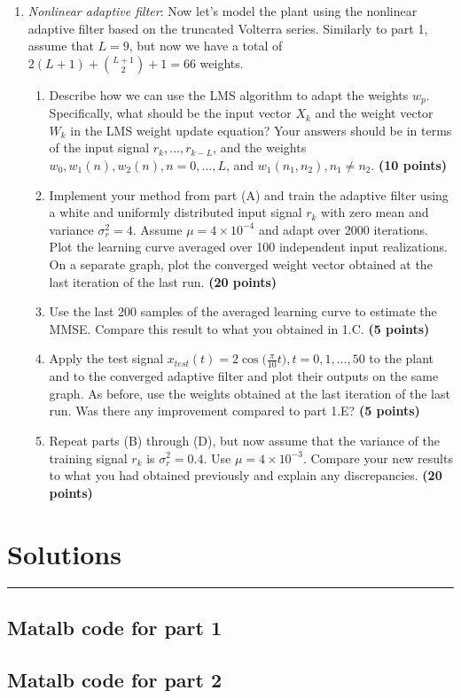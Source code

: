 \documentclass[10pt]{article}
\begin{document}
\begin{enumerate}
	\item\textit{Nonlinear adaptive filter}: Now let's model the plant using the nonlinear adaptive filter based on the truncated Volterra series. Similarly to part 1, assume that $L = 9$, but now we have a total of $2(L+1) + \binom{L+1}{2} + 1 = 66$ weights.
	
	\begin{enumerate}[label=\textbf{(\Alph*)}]
		\item Describe how we can use the LMS algorithm to adapt the weights $w_p$. Specifically, what should be the input vector $X_k$ and the weight vector $W_k$ in the LMS weight update equation? Your answers should be in terms of the input signal $r_k, \ldots, r_{k-L}$, and the weights $w_0, w_1(n), w_2(n), n = 0, \ldots, L$, and $w_1(n_1, n_2), n_1\neq n_2$. \textbf{(10 points)} 
		\item Implement your method from part (A) and train the adaptive filter using a white and uniformly distributed input signal $r_k$ with zero mean and variance $\sigma_r^2 = 4$. Assume $\mu = 4\times 10^{-4}$ and adapt over 2000 iterations. Plot the learning curve averaged over 100 independent input realizations. On a separate graph, plot the converged weight vector obtained at the last iteration of the last  run. \textbf{(20 points)} 
		\item Use the last 200 samples of the averaged learning curve to estimate the MMSE. Compare this result to what you obtained in 1.C. \textbf{(5 points)} 
		\item Apply the test signal $x_{test}(t) = 2\cos\big(\frac{\pi}{10} t\big), t = 0, 1,\ldots, 50$ to the plant and to the converged adaptive filter and plot their outputs on the same graph. As before, use the weights obtained at the last iteration of the last run. Was there any improvement compared to part 1.E? \textbf{(5 points)}
		\item Repeat parts (B) through (D), but now assume that the variance of the training signal $r_k$ is $\sigma_r^2 = 0.4$. Use $\mu = 4\times10^{-3}$. Compare your new results to what you had obtained previously and explain any discrepancies. \textbf{(20 points)}
	\end{enumerate}
	
\end{enumerate}

\pagebreak
\section*{Solutions}
\vspace{-8mm}
\rule{\textwidth}{1pt}

\singlespacing
\subsection*{Matalb code for part 1}

\doublespacing

\singlespacing
\subsection*{Matalb code for part 2}

\end{document}
